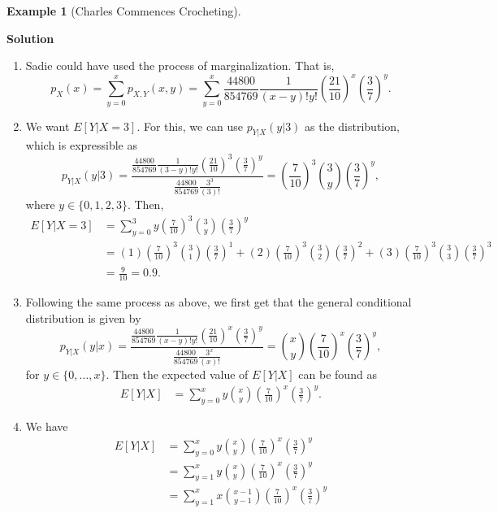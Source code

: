 \documentclass[
  letterpaper,
  DIV=11,
  numbers=noendperiod]{scrreprt}
\providecommand{\tightlist}{%
  \setlength{\itemsep}{0pt}\setlength{\parskip}{0pt}}\usepackage{longtable,booktabs,array}
\theoremstyle{definition}
\theoremstyle{definition}
\newtheorem{example}{Example}[chapter]
\theoremstyle{definition}
\theoremstyle{remark}
\begin{document}
\begin{example}[Charles Commences
Crocheting]
\begin{tcolorbox}[enhanced jigsaw, colback=white, colframe=quarto-callout-color-frame, arc=.35mm, leftrule=.75mm, rightrule=.15mm, opacityback=0, breakable, bottomrule=.15mm, left=2mm, toprule=.15mm]
\vspace{-3mm}\textbf{Solution}\vspace{3mm}

\begin{enumerate}
\def\labelenumi{\alph{enumi}.}
\tightlist
\item
  Sadie could have used the process of marginalization. That is,
  \[p_X(x) = \sum_{y = 0}^{x} p_{X,Y}(x,y) = \sum_{y=0}^{x} \frac{44800}{854769} \frac{1}{(x-y)!y!} \left(\frac{21}{10}\right)^x\left(\frac{3}{7}\right)^{y}.\]
\item
  We want \(E[Y|X=3]\). For this, we can use \(p_{Y|X}(y|3)\) as the
  distribution, which is expressible as
  \[p_{Y|X}(y|3) = \frac{\frac{44800}{854769} \frac{1}{(3-y)!y!} \left(\frac{21}{10}\right)^3\left(\frac{3}{7}\right)^{y}}{\frac{44800}{854769} \frac{3^{3}}{(3)!}} = \left(\frac{7}{10}\right)^3\binom{3}{y}\left(\frac{3}{7}\right)^y,\]
  where \(y \in \{0,1,2,3\}\). Then, \begin{align*}
   E[Y|X=3] &= \sum_{y=0}^3 y\left(\frac{7}{10}\right)^3\binom{3}{y}\left(\frac{3}{7}\right)^y \\
   &= (1)\left(\frac{7}{10}\right)^3\binom{3}{1}\left(\frac{3}{7}\right)^1 + (2)\left(\frac{7}{10}\right)^3\binom{3}{2}\left(\frac{3}{7}\right)^2 + (3)\left(\frac{7}{10}\right)^3\binom{3}{3}\left(\frac{3}{7}\right)^3 \\
   &= \frac{9}{10} = 0.9.
  \end{align*}
\item
  Following the same process as above, we first get that the general
  conditional distribution is given by
  \[p_{Y|X}(y|x) = \frac{\frac{44800}{854769} \frac{1}{(x-y)!y!} \left(\frac{21}{10}\right)^x\left(\frac{3}{7}\right)^{y}}{\frac{44800}{854769} \frac{3^{x}}{(x)!}} = \binom{x}{y}\left(\frac{7}{10}\right)^x\left(\frac{3}{7}\right)^y,\]
  for \(y\in\{0,\dots,x\}\). Then the expected value of \(E[Y|X]\) can
  be found as \begin{align*}
  E[Y|X] &= \sum_{y=0}^x y\binom{x}{y}\left(\frac{7}{10}\right)^x\left(\frac{3}{7}\right)^y.
  \end{align*}
\item
  We have \begin{align*}
  E[Y|X] &= \sum_{y=0}^x y\binom{x}{y}\left(\frac{7}{10}\right)^x\left(\frac{3}{7}\right)^y \\
  &= \sum_{y=1}^x y\binom{x}{y}\left(\frac{7}{10}\right)^x\left(\frac{3}{7}\right)^y \\
  &= \sum_{y=1}^x x\binom{x-1}{y-1}\left(\frac{7}{10}\right)^x\left(\frac{3}{7}\right)^y \\

\end{align*}
\end{enumerate}
\end{tcolorbox}
\end{example}
\end{document}
